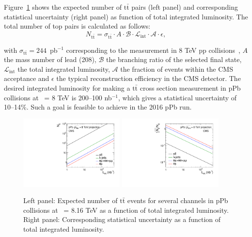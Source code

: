 Figure~\ref{fig:ttPPbProjections} shows the expected number of 
$\mathrm{t}\bar{\mathrm{t}}$ pairs (left panel) and corresponding 
statistical uncertainty (right panel) as function of total integrated 
luminosity. The total number of top pairs is calculated as follows:
\begin{equation}
N_{\mathrm{t}\bar{\mathrm{t}}} = \sigma_{\mathrm{t}\bar{\mathrm{t}}} \cdot A \cdot \mathcal{B} \cdot \mathcal{L}_{\mathrm{int}} \cdot \mathcal{A} \cdot \epsilon,
\end{equation}

\noindent with $\sigma_{\mathrm{t}\bar{\mathrm{t}}}=244$~pb$^{-1}$ 
corresponding to the measurement in 8 TeV pp collisions~\cite{Khachatryan:2016mqs}, 
$A$ the mass number of lead (208), $\mathcal{B}$ the branching ratio 
of the selected final state, $\mathcal{L}_{\mathrm{int}}$ the total integrated luminosity, 
$\mathcal{A}$ the fraction of events within the CMS acceptance and 
$\epsilon$ the typical reconstruction efficiency in the CMS detector.
The desired integrated luminosity for making a $\mathrm{t}\bar{\mathrm{t}}$
cross section measurement in pPb collisions at \rootsNN\ = 8 TeV is 200--100 nb$^{-1}$,
which gives a statistical uncertainty of 10--14\%. Such a goal is feasible to
achieve in the 2016 pPb run.

\begin{figure}[h!]
\begin{center}
  \includegraphics[width= 0.47\textwidth]{figures/top/ProjectedTTbarYield.pdf}
  \includegraphics[width= 0.47\textwidth]{figures/top/ProjectedTTbarStatUnc.pdf}
  \caption{Left panel: Expected number of $\mathrm{t}\bar{\mathrm{t}}$ events 
  for several channels in pPb collisions at \rootsNN\ = 8.16 TeV as a function 
  of total integrated luminosity. Right panel: Corresponding statistical uncertainty 
  as a function of total integrated luminosity.
  }
\label{fig:ttPPbProjections}
\end{center}
\end{figure}

